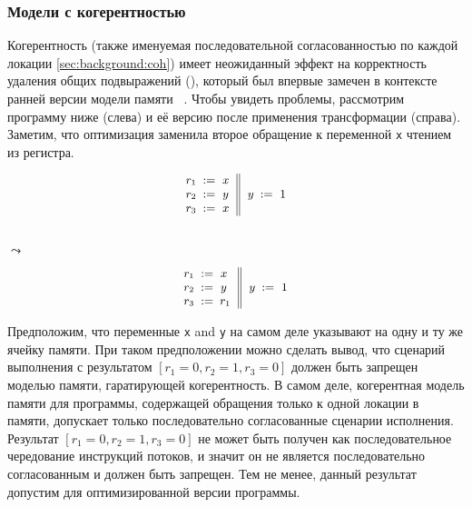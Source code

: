 \subsubsection{Модели с когерентностью}
\label{sec:analysis:coh}

Когерентность (также именуемая последовательной согласованностью 
по каждой локации \cref{sec:background:coh})
имеет неожиданный эффект на корректность удаления общих подвыражений (\CSE), 
который был впервые замечен в контексте ранней версии модели памяти \Java~\cite{Pugh:JAVA99}.
Чтобы увидеть проблемы, рассмотрим программу ниже (слева) 
и её версию после применения трансформации \CSE (справа).
Заметим, что оптимизация заменила второе обращение 
к переменной \texttt{x} чтением из регистра. 

\begin{minipage}{0.45\linewidth}
\begin{equation*}
\small
\inarrII{
  \readInst{}{r_1}{x}      \\
  \readInst{}{r_2}{y}      \\
  \readInst{}{r_3}{x}      \\
}{
  \writeInst{}{y}{1}       \\
}
\label{ex:coh-rr}
\end{equation*}
\end{minipage}\hfill%
\begin{minipage}{0.05\linewidth}
\Large~\\ $\leadsto$
\end{minipage}\hfill%
\begin{minipage}{0.45\linewidth}
\begin{equation*}
\small
\inarrII{
  \readInst{}{r_1}{x}      \\
  \readInst{}{r_2}{y}      \\
  \assignInst{r_3}{r_1}    \\
}{
  \writeInst{}{y}{1}       \\
}
\label{ex:coh-rr}
\end{equation*}
\end{minipage}

Предположим, что переменные \texttt{x} and \texttt{y} 
на самом деле указывают на одну и ту же ячейку памяти.  
При таком предположении можно сделать вывод, что 
сценарий выполнения с результатом ${[r_1=0, r_2=1, r_3=0]}$
должен быть запрещен моделью памяти, гаратирующей когерентность. 
В самом деле, когерентная модель памяти для программы, 
содержащей обращения только к одной локации в памяти, 
допускает только последовательно согласованные сценарии исполнения.
Результат ${[r_1=0, r_2=1, r_3=0]}$ не может быть получен
как последовательное чередование инструкций потоков, 
и значит он не является последовательно согласованным и должен быть запрещен.
Тем не менее, данный результат допустим для 
оптимизированной версии программы. 

